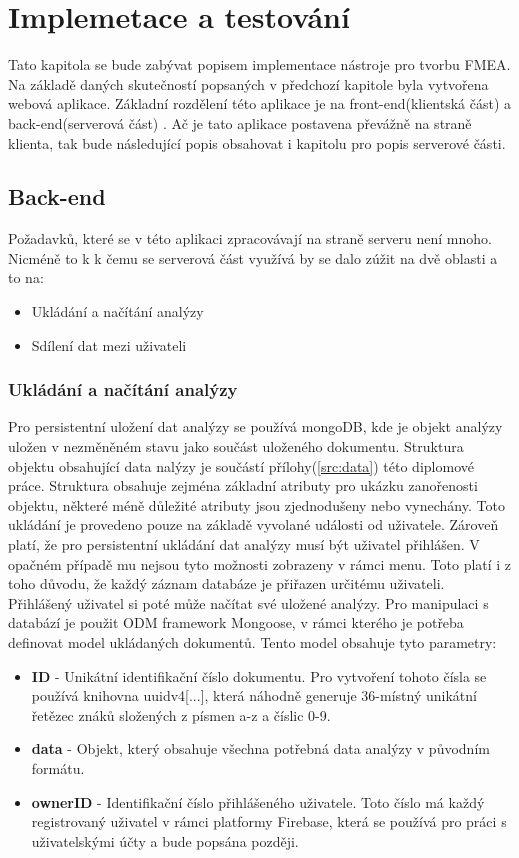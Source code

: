 \chapter{Implemetace a testování}
\label{sec:implementace}
Tato kapitola se bude zabývat popisem implementace nástroje pro tvorbu FMEA. Na základě daných skutečností popsaných v předchozí kapitole byla vytvořena webová aplikace. Základní rozdělení této aplikace je na front-end(klientská část) a back-end(serverová část) . Ač je tato aplikace postavena převážně na straně klienta, tak bude následující popis obsahovat i kapitolu pro popis serverové části.

\section{Back-end}
Požadavků, které se v této aplikaci zpracovávají na straně serveru není mnoho. Nicméně to k k čemu se serverová část využívá by se dalo zúžit na dvě oblasti a to na: 
\begin{itemize}
    \item Ukládání a načítání analýzy
    \item Sdílení dat mezi uživateli
\end{itemize}

\subsection{Ukládání a načítání analýzy}
Pro persistentní uložení dat analýzy se používá mongoDB, kde je objekt analýzy uložen v nezměněném stavu jako součást uloženého dokumentu. Struktura objektu obsahující data nalýzy je součástí přílohy(\ref{src:data}) této diplomové práce. Struktura obsahuje zejména základní atributy pro ukázku zanořenosti objektu, některé méně důležité atributy jsou zjednodušeny nebo vynechány. Toto ukládání je provedeno pouze na základě vyvolané události od uživatele. Zároveň platí, že pro persistentní ukládání dat analýzy musí být uživatel přihlášen. V opačném případě mu nejsou tyto možnosti zobrazeny v rámci menu. Toto platí i z toho důvodu, že každý záznam databáze je přiřazen určitému uživateli. Přihlášený uživatel si poté může načítat své uložené analýzy. Pro manipulaci s databází je použit ODM framework Mongoose, v rámci kterého je potřeba definovat model ukládaných dokumentů. Tento model obsahuje tyto parametry: 
\begin{itemize}
    \item \textbf{ID} - Unikátní identifikační číslo dokumentu. Pro vytvoření tohoto čísla se používá knihovna uuidv4[...], která náhodně generuje 36-místný unikátní řetězec znáků složených z písmen a-z a číslic 0-9.  
    \item \textbf{data} - Objekt, který obsahuje všechna potřebná data analýzy v původním formátu.
    \item \textbf{ownerID} - Identifikační číslo přihlášeného uživatele. Toto číslo má každý registrovaný uživatel v rámci platformy Firebase, která se používá pro práci s uživatelskými účty a bude popsána později. 
\end{itemize}

